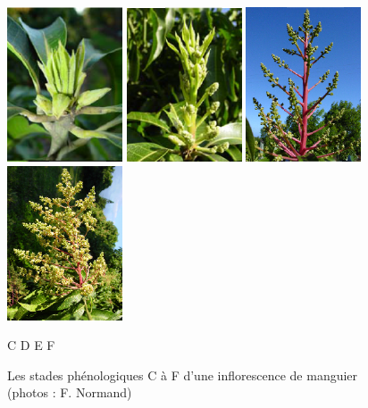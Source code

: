 \begin{figure}[ht]
 \centering
 \includegraphics[scale = 0.8]{photos/infloC.png}
 \includegraphics[scale = 0.8]{photos/infloD.png}
 \includegraphics[scale = 0.8]{photos/infloE.png}
 \includegraphics[scale = 0.8]{photos/infloF.png}
 
 C \hspace{2.3cm} D \hspace{2.3cm} E \hspace{2.3cm} F
 \caption{Les stades phénologiques C à F d'une inflorescence de manguier (photos : F. Normand)}
 \label{fig:stades_inflo}
\end{figure}



